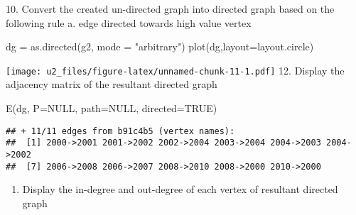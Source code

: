 \documentclass[
]{article}
\newenvironment{Shaded}{\begin{snugshade}}{\end{snugshade}}
\newcommand{\AttributeTok}[1]{\textcolor[rgb]{0.77,0.63,0.00}{#1}}
\newcommand{\CommentTok}[1]{\textcolor[rgb]{0.56,0.35,0.01}{\textit{#1}}}
\newcommand{\ConstantTok}[1]{\textcolor[rgb]{0.00,0.00,0.00}{#1}}
\newcommand{\FunctionTok}[1]{\textcolor[rgb]{0.00,0.00,0.00}{#1}}
\newcommand{\NormalTok}[1]{#1}
\newcommand{\OtherTok}[1]{\textcolor[rgb]{0.56,0.35,0.01}{#1}}
\newcommand{\SpecialCharTok}[1]{\textcolor[rgb]{0.00,0.00,0.00}{#1}}
\newcommand{\StringTok}[1]{\textcolor[rgb]{0.31,0.60,0.02}{#1}}
\providecommand{\tightlist}{%
  \setlength{\itemsep}{0pt}\setlength{\parskip}{0pt}}
\begin{document}
10. Convert the created un-directed graph into directed graph based on
the following rule a. edge directed towards high value vertex

\begin{Shaded}
\begin{Highlighting}[]
\NormalTok{dg }\OtherTok{=} \FunctionTok{as.directed}\NormalTok{(g2, }\AttributeTok{mode =} \StringTok{"arbitrary"}\NormalTok{)}
\FunctionTok{plot}\NormalTok{(dg,}\AttributeTok{layout=}\NormalTok{layout.circle)}
\end{Highlighting}
\end{Shaded}

\texttt{[image: u2\_files/figure-latex/unnamed-chunk-11-1.pdf]} 12.
Display the adjacency matrix of the resultant directed graph

\begin{Shaded}
\begin{Highlighting}[]
\FunctionTok{E}\NormalTok{(dg, }\AttributeTok{P=}\ConstantTok{NULL}\NormalTok{, }\AttributeTok{path=}\ConstantTok{NULL}\NormalTok{, }\AttributeTok{directed=}\ConstantTok{TRUE}\NormalTok{)}
\end{Highlighting}
\end{Shaded}

\begin{verbatim}
## + 11/11 edges from b91c4b5 (vertex names):
##  [1] 2000->2001 2001->2002 2002->2004 2003->2004 2004->2003 2004->2002
##  [7] 2006->2008 2006->2007 2008->2010 2008->2000 2010->2000
\end{verbatim}

\begin{enumerate}
\def\labelenumi{\arabic{enumi}.}
\setcounter{enumi}{12}
\tightlist
\item
  Display the in-degree and out-degree of each vertex of resultant
  directed graph
\end{enumerate}

\begin{Shaded}
\end{Shaded}
\end{document}
